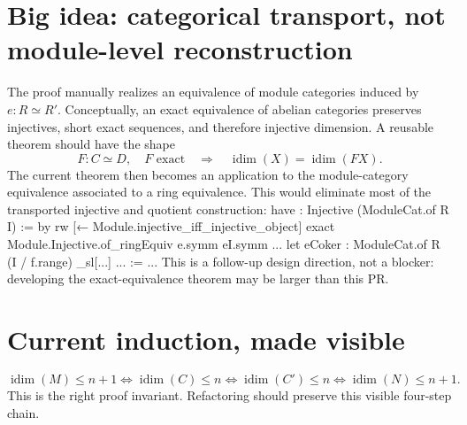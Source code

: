 \documentclass[10pt]{article}
\newenvironment{lean}{\Verbatim[fontsize=\scriptsize,frame=single,framesep=2mm,formatcom=\leanfont]}{\endVerbatim}
\newcommand{\idim}{\operatorname{idim}}
\begin{document}
\section*{Big idea: categorical transport, not module-level reconstruction}
The proof manually realizes an equivalence of module categories induced by \(e:R\simeq R'\).
Conceptually, an exact equivalence of abelian categories preserves injectives, short exact sequences,
and therefore injective dimension. A reusable theorem should have the shape
\[
 F:C\simeq D,\quad F\text{ exact}
 \quad\Longrightarrow\quad
 \idim(X)=\idim(FX).
\]
The current theorem then becomes an application to the module-category equivalence associated to a
ring equivalence. This would eliminate most of the transported injective and quotient construction:
\begin{lean}
have : Injective (ModuleCat.of R I) := by
  rw [← Module.injective_iff_injective_object]
  exact Module.Injective.of_ringEquiv e.symm eI.symm
...
let eCoker : ModuleCat.of R (I / f.range) \simeq_sl[...] ... := { ... }
\end{lean}
This is a follow-up design direction, not a blocker: developing the exact-equivalence theorem may be
larger than this PR.

\begin{center}
\end{center}

\section*{Current induction, made visible}
\begin{center}
\end{center}
\[
\idim(M)\le n+1
\iff \idim(C)\le n
\iff \idim(C')\le n
\iff \idim(N)\le n+1.
\]
This is the right proof invariant. Refactoring should preserve this visible four-step chain.
\end{document}
